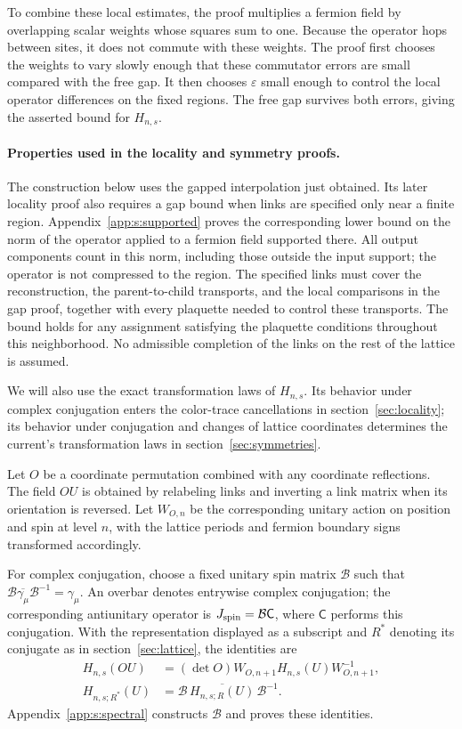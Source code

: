 \documentclass[11pt,a4paper]{article}
\theoremstyle{remark}
\newcommand{\eps}{\varepsilon}
\begin{document}
To combine these local estimates, the proof multiplies a fermion field
by overlapping scalar weights whose squares sum to one. Because the
operator hops between sites, it does not commute with these weights.
The proof first chooses the weights to vary slowly enough that these
commutator errors are small compared with the free gap. It then chooses
$\eps$ small enough to control the local operator differences on the
fixed regions. The free gap survives both errors, giving the asserted
bound for $H_{n,s}$.

\paragraph{Properties used in the locality and symmetry proofs.}
The construction below uses the gapped interpolation just obtained. Its
later locality proof also requires a gap bound when links are specified
only near a finite region. Appendix~\ref{app:s:supported}
proves the corresponding lower bound on the norm of the operator applied
to a fermion field supported there. All output components count in this
norm, including those outside the input support; the operator is not
compressed to the region. The specified links must cover the reconstruction,
the parent-to-child transports, and the local comparisons in the gap
proof, together with every plaquette needed to control these transports.
The bound holds for any assignment satisfying the plaquette conditions
throughout this neighborhood. No admissible completion of the links on
the rest of the lattice is assumed.

We will also use the exact transformation laws of $H_{n,s}$. Its behavior
under complex conjugation enters the color-trace cancellations in
section~\ref{sec:locality}; its behavior under conjugation and changes of
lattice coordinates determines the current's transformation laws in
section~\ref{sec:symmetries}.

Let $O$ be a coordinate permutation combined with any coordinate
reflections. The field $OU$ is obtained by relabeling links and inverting
a link matrix when its orientation is reversed. Let $W_{O,n}$ be the
corresponding unitary action on position and spin at level $n$, with the
lattice periods and fermion boundary signs transformed accordingly.

For complex conjugation, choose a fixed unitary spin matrix $\mathcal B$
such that $\mathcal B\overline{\gamma_\mu}\mathcal B^{-1}=\gamma_\mu$.
An overbar denotes entrywise complex conjugation; the corresponding
antiunitary operator is $J_{\rm spin}=\mathcal B\mathsf C$, where
$\mathsf C$ performs this conjugation. With the representation displayed
as a subscript and $R^*$ denoting its conjugate as in
section~\ref{sec:lattice}, the identities are
\begin{equation}
 \begin{split}
 H_{n,s}(OU)&=(\det O)W_{O,n+1}H_{n,s}(U)W_{O,n+1}^{-1},\\
 H_{n,s;R^*}(U)&=\mathcal B\,
       \overline{H_{n,s;R}(U)}\,\mathcal B^{-1}.
 \end{split}
 \label{eq:kernel-symmetry}
\end{equation}
Appendix~\ref{app:s:spectral} constructs $\mathcal B$ and proves these
identities.
\end{document}
